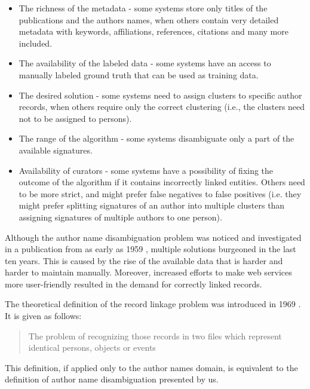 \documentclass{pracamgr}
\begin{document}
\begin{itemize}

\item The richness of the metadata - some systems store only titles of the publications and the
authors names, when others contain very detailed metadata with keywords, affiliations,
references, citations and many more included.

\item The availability of the labeled data - some systems have an access to manually
labeled ground truth that can be used as training data.

\item The desired solution - some systems need to assign clusters to specific author
records, when others require only the correct clustering (i.e., the clusters need
not to be assigned to persons).

\item The range of the algorithm - some systems disambiguate only a part of the available
signatures.

\item Availability of curators - some systems have a possibility of fixing the outcome of the
algorithm if it contains incorrectly linked entities. Others need to be more strict, and might
prefer false negatives to false positives (i.e. they might prefer splitting signatures of an
author into multiple clusters than assigning signatures of multiple authors to one person).

\end{itemize}

Although the author name disambiguation problem was noticed and investigated in a publication
from as early as 1959 \citep{Newcombe}, multiple solutions burgeoned in the last ten years.
This is caused by the rise of the available data that is harder and harder to maintain
manually. Moreover, increased efforts to make web services more user-friendly resulted in
the demand for correctly linked records.

The theoretical definition of the record linkage problem was introduced in
1969 \citep{fellegi}. It is given as follows: 

\begin{quote}
The problem of recognizing
those records in two files which represent identical persons, objects or
events
\end{quote}

This definition, if applied only to the author names domain, is equivalent to the definition
of author name disambiguation presented by us.
\end{document}
